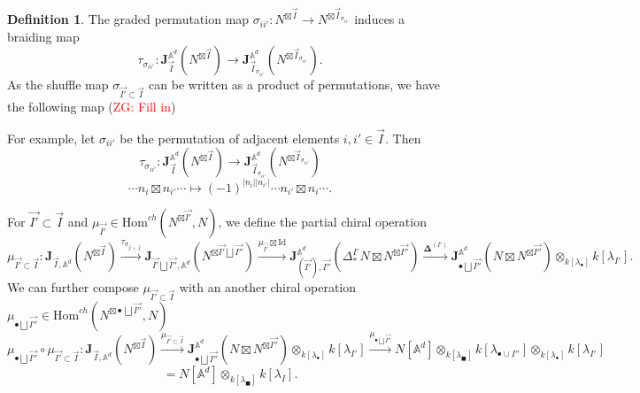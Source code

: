 \documentclass[11pt]{amsart}
\theoremstyle{definition}
\newtheorem{defn}[thm]{Definition}
\theoremstyle{remark}
\numberwithin{equation}{section}
\newcommand{\Gui}[1]{(\textcolor{red}{ZG: #1})}
\begin{document}
\begin{defn}
The graded permutation map $\sigma_{ii'}:N^{\boxtimes\vec{I}}\rightarrow N^{\boxtimes \vec{I}_{\sigma_{ii'}}}$ induces a braiding map
$$
        \tau_{\sigma_{ii'}}:\mathbf{J}^{\mathbb{A}^d}_{\vec{I}}(N^{\boxtimes\vec{I}})\rightarrow \mathbf{J}^{\mathbb{A}^d}_{\vec{I}_{\sigma_{ii'}}}(N^{\boxtimes \vec{I}_{\sigma_{ii'}}}).
$$
As the shuffle map $\sigma_{\vec{I'}\subset\vec{I}}$  can be written as a product of permutations, we have the following map
\Gui{Fill in}


For example, let $\sigma_{ii'}$ be the permutation of adjacent elements $i,i'\in\vec{I}$. Then
        $$
        \tau_{\sigma_{ii'}}:\mathbf{J}^{\mathbb{A}^d}_{\vec{I}}(N^{\boxtimes\vec{I}})\rightarrow \mathbf{J}^{\mathbb{A}^d}_{\vec{I}_{\sigma_{ii'}}}(N^{\boxtimes \vec{I}_{\sigma_{ii'}}})
        $$
             $$
        \cdots n_i\boxtimes n_{i'}\cdots\mapsto (-1)^{|n_i||n_{i'}|}\cdots n_{i'}\boxtimes n_{i}\cdots.
        $$
\end{defn}



For $\vec{I'}\subset \vec{I}$ and $\mu_{\vec{I'}}\in   \mathrm{Hom}^{ch}(N^{\boxtimes\vec{I'}},N)$, we define the partial chiral operation
$$
\mu_{\vec{I'}\subset \vec{I}}:\mathbf{J}_{\vec{I},\mathbb{A}^d}(N^{\boxtimes\vec{I}})\xrightarrow{\tau_{\sigma_{\vec{I'}\subset\vec{I}}}}\mathbf{J}_{\vec{I'}\bigsqcup \vec{I''},\mathbb{A}^d}(N^{\boxtimes\vec{I'}\bigsqcup \vec{I''}})\xrightarrow{\mu_{\vec{I'}}\boxtimes \mathrm{Id}} \mathbf{J}_{(\vec{I'}),\vec{{I''}}}^{\mathbb{A}^d}(\Delta^{I'}_*N\boxtimes N^{\boxtimes\vec{I''}})\xrightarrow{\mathbf{\Delta}^{(I')}} \mathbf{J}_{\bullet\bigsqcup\vec{I''}}^{\mathbb{A}^d}(N\boxtimes N^{\boxtimes\vec{I''}})\otimes_{k[\lambda_{\bullet}]}k[\lambda_{I'}].
$$
We can further compose $\mu_{\vec{I'}\subset \vec{I}}$ with an another chiral operation $\mu_{\bullet \bigsqcup \vec{I''}}\in \mathrm{Hom}^{ch}(N^{\boxtimes \bullet \bigsqcup \vec{I''}},N)$
$$
\mu_{\bullet \bigsqcup \vec{I''}}\circ\mu_{\vec{I'}\subset \vec{I}}:\mathbf{J}_{\vec{I},\mathbb{A}^d}(N^{\boxtimes\vec{I}})\xrightarrow{\mu_{\vec{I'}\subset \vec{I}}} \mathbf{J}_{\bullet\bigsqcup\vec{I''}}^{\mathbb{A}^d}(N\boxtimes N^{\boxtimes\vec{I''}})\otimes_{k[\lambda_{\bullet}]}k[\lambda_{I'}]\xrightarrow{\mu_{\bullet \bigsqcup \vec{I''}}}N[\mathbb{A}^d]\otimes_{k[\lambda_{\blacksquare}]}k[\lambda_{\bullet\cup I''}]\otimes_{k[\lambda_{\bullet}]}k[\lambda_{I'}]
$$
$$
=N[\mathbb{A}^d]\otimes_{k[\lambda_{\blacksquare}]}k[\lambda_{I}].
$$
\end{document}
